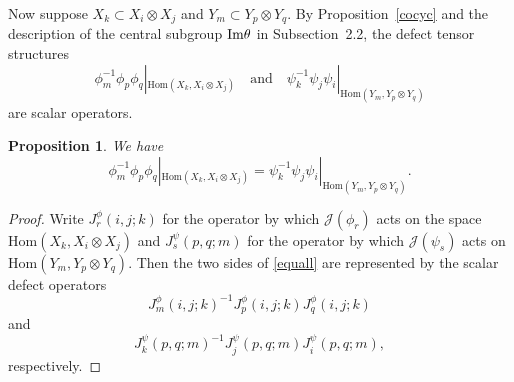 \documentclass[12pt]{amsart}
\numberwithin{equation}{section}
\newtheorem{proposition}[theorem]{Proposition}
\theoremstyle{definition}
\newcommand{\Hom}{\text{Hom}}
\newcommand{\1}{_{(1)}}
\newcommand{\2}{_{(2)}}
\newcommand{\3}{_{(3)}}
\newcommand{\4}{_{(4)}}
\newcommand{\5}{_{(5)}}
\newcommand{\6}{_{(6)}}
\theoremstyle{plain}
\theoremstyle{definition}
\theoremstyle{remark}
\def\Hom{\mathrm{Hom}}
\begin{document}
Now suppose $X_k\subset X_i\otimes X_j$ and $Y_m\subset Y_p\otimes Y_q$.  By Proposition~\ref{cocyc} and the description of the central subgroup ${\rm Im}\theta$ in Subsection~2.2, the defect tensor structures
\[
        \phi_m^{-1}\phi_p\phi_q|_{\Hom(X_k,X_i\otimes X_j)}
        \quad\text{and}\quad
        \psi_k^{-1}\psi_j\psi_i|_{\Hom(Y_m,Y_p\otimes Y_q)}
\]
are scalar operators. 

\begin{proposition}\label{phipsi} 
We have 
\begin{equation}\label{equall}
\phi_m^{-1}\phi_p\phi_q|_{\Hom(X_k,X_i\otimes X_j)}=\psi_k^{-1}\psi_j\psi_i|_{\Hom(Y_m,Y_p\otimes Y_q)}.
\end{equation}
\end{proposition} 

\begin{proof} Write $J^\phi_r(i,j;k)$ for the operator by which $\mathcal J(\phi_r)$ acts on the space $\Hom(X_k,X_i\otimes X_j)$ and $J^\psi_s(p,q;m)$ for the operator by which $\mathcal J(\psi_s)$ acts on $\Hom(Y_m,Y_p\otimes Y_q)$. Then the two sides of \eqref{equall} are represented by the scalar defect operators
\[
        J^\phi_m(i,j;k)^{-1}J^\phi_p(i,j;k)J^\phi_q(i,j;k)
\]
and
\[
        J^\psi_k(p,q;m)^{-1}J^\psi_j(p,q;m)J^\psi_i(p,q;m),
\]
respectively.


\end{proof}
\end{document}
